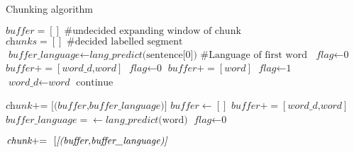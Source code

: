 \documentclass{article}
\begin{document}
\begin{algorithm}
\caption{Chunking algorithm}\label{euclid}
\begin{algorithmic}[1]
\Procedure{}{}
\State $\textit{buffer} = [] \text{\ \ \  \#undecided expanding window of chunk}$
\State $\textit{chunks} = [] \text{\ \ \  \#decided labelled segment}$
\State $\textit{buffer\_language} \gets \textit{lang\_predict}\text{(sentence[0])} \text{\ \ \ \#Language of first word}$
\State $\textit{flag} \gets \text{0}$
	\State $\textit{buffer} += [\textit{word\_d,word}] $
	\State $\textit{flag} \gets \text{0}$
        \Else 
	\State $\textit{buffer} += [\textit{word}] $
	\EndIf
        \EndIf
{}
	\State $\textit{flag} \gets \text{1}$
	\State $\textit{word\_d} \gets \textit{word} $
	\State $\text{continue}$

	\Else 
	\State $\textit{chunk} \text{+= \ }  \textit{[(buffer,buffer\_language)]} $
	\State $\textit{buffer} \gets [] $
	\State $\textit{buffer} += [\textit{word\_d,word}] $
	\State $\textit{buffer\_language} = \gets \textit{lang\_predict}\text{(word)}$%
	\State $\textit{flag} \gets \text{0}$
	\EndIf

\EndIf
\EndFor
{}
	\State $\textit{chunk} \text{+= \ }  \text{[\textit{[(buffer,buffer\_language)]}} $

\EndIf
\EndProcedure
\end{algorithmic}
\end{algorithm}
\end{document}
